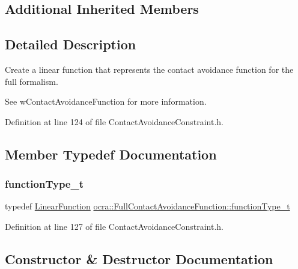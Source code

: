 \subsection*{Additional Inherited Members}


\subsection{Detailed Description}
Create a linear function that represents the contact avoidance function for the full formalism. 

See w\+Contact\+Avoidance\+Function for more information. 

Definition at line 124 of file Contact\+Avoidance\+Constraint.\+h.



\subsection{Member Typedef Documentation}
\hypertarget{classocra_1_1FullContactAvoidanceFunction_a9b59cb139be82095188084893d70b996}{}\label{classocra_1_1FullContactAvoidanceFunction_a9b59cb139be82095188084893d70b996} 
\subsubsection{\texorpdfstring{function\+Type\+\_\+t}{functionType\_t}}
{\footnotesize\ttfamily typedef \hyperlink{classocra_1_1LinearFunction}{Linear\+Function} \hyperlink{classocra_1_1FullContactAvoidanceFunction_a9b59cb139be82095188084893d70b996}{ocra\+::\+Full\+Contact\+Avoidance\+Function\+::function\+Type\+\_\+t}}



Definition at line 127 of file Contact\+Avoidance\+Constraint.\+h.



\subsection{Constructor \& Destructor Documentation}
\hypertarget{classocra_1_1FullContactAvoidanceFunction_aa1632bec7158003ab2da17f71aa134e0}{}\label{classocra_1_1FullContactAvoidanceFunction_aa1632bec7158003ab2da17f71aa134e0} 
